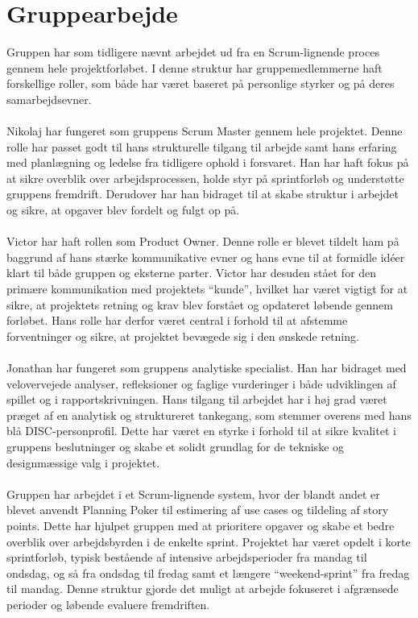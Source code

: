 \section{Gruppearbejde}
Gruppen har som tidligere nævnt arbejdet ud fra en Scrum-lignende proces gennem hele projektforløbet. I denne struktur har gruppemedlemmerne haft forskellige roller, som både har været baseret på personlige styrker og på deres samarbejdsevner.
\\\\
Nikolaj har fungeret som gruppens Scrum Master gennem hele projektet. Denne rolle har passet godt til hans strukturelle tilgang til arbejde samt hans erfaring med planlægning og ledelse fra tidligere ophold i forsvaret. Han har haft fokus på at sikre overblik over arbejdsprocessen, holde styr på sprintforløb og understøtte gruppens fremdrift. Derudover har han bidraget til at skabe struktur i arbejdet og sikre, at opgaver blev fordelt og fulgt op på.
\\\\
Victor har haft rollen som Product Owner. Denne rolle er blevet tildelt ham på baggrund af hans stærke kommunikative evner og hans evne til at formidle idéer klart til både gruppen og eksterne parter. Victor har desuden stået for den primære kommunikation med projektets “kunde”, hvilket har været vigtigt for at sikre, at projektets retning og krav blev forstået og opdateret løbende gennem forløbet. Hans rolle har derfor været central i forhold til at afstemme forventninger og sikre, at projektet bevægede sig i den ønskede retning.
\\\\
Jonathan har fungeret som gruppens analytiske specialist. Han har bidraget med velovervejede analyser, refleksioner og faglige vurderinger i både udviklingen af spillet og i rapportskrivningen. Hans tilgang til arbejdet har i høj grad været præget af en analytisk og struktureret tankegang, som stemmer overens med hans blå DISC-personprofil. Dette har været en styrke i forhold til at sikre kvalitet i gruppens beslutninger og skabe et solidt grundlag for de tekniske og designmæssige valg i projektet.
\\\\
Gruppen har arbejdet i et Scrum-lignende system, hvor der blandt andet er blevet anvendt Planning Poker til estimering af use cases og tildeling af story points. Dette har hjulpet gruppen med at prioritere opgaver og skabe et bedre overblik over arbejdsbyrden i de enkelte sprint. Projektet har været opdelt i korte sprintforløb, typisk bestående af intensive arbejdsperioder fra mandag til ondsdag, og så fra ondsdag til fredag samt et længere “weekend-sprint” fra fredag til mandag. Denne struktur gjorde det muligt at arbejde fokuseret i afgrænsede perioder og løbende evaluere fremdriften.
